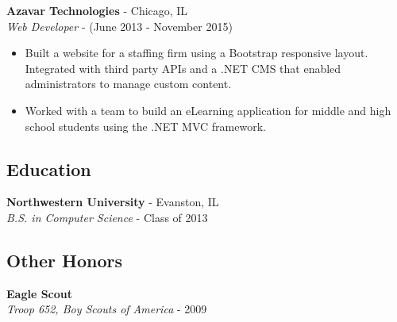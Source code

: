 \documentclass[12pt]{article}
\begin{document}
\begin{paracol}{2}
\noindent \textbf{Azavar Technologies} - Chicago, IL \\
\textit{Web Developer} - {\footnotesize(June 2013 - November 2015)}
\begin{itemize}
    \setlength\itemsep{0.1em}
    \item {\footnotesize{Built a website for a staffing firm using a Bootstrap responsive layout. Integrated with third party APIs and a .NET CMS that enabled administrators to manage custom content.}}
    \item {\footnotesize{Worked with a team to build an eLearning application for middle and high school students using the .NET MVC framework. }} 
\end{itemize}

\subsection*{Education}
\textbf{Northwestern University} - Evanston, IL \\
\textit{B.S. in Computer Science} - {\footnotesize{Class of 2013}}

\subsection*{Other Honors}
\textbf{Eagle Scout} \\
\textit{Troop 652, Boy Scouts of America} - {\footnotesize{2009}}
    
\end{paracol}
\end{document}
